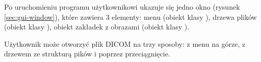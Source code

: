 
\par
Po uruchomieniu programu użytkownikowi ukazuje się jedno okno (rysunek \ref{sec:gui-window}), które zawiera 3 elementy: menu (obiekt klasy ), drzewa plików (obiekt klasy ), obiekt zakładek z obrazami (obiekt klasy ).
\par
Użytkownik może otworzyć plik DICOM na trzy sposoby: z menu na górze, z drzewem ze strukturą pików i poprzez przeciągnięcie.